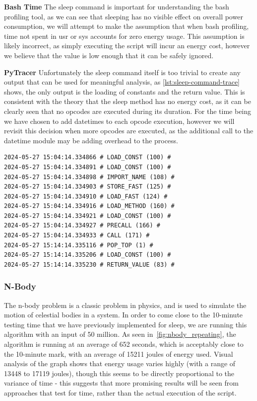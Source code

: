 \textbf{Bash Time}
The sleep command is important for understanding the bash profiling tool, as we can see that sleeping has no visible
effect on overall power consumption, we will attempt to make the assumption that when bash profiling, time not spent in
usr or sys accounts for zero energy usage.
This assumption is likely incorrect, as simply executing the script will incur an energy cost, however we believe that
the value is low enough that it can be safely ignored.

\textbf{PyTracer}
Unfortunately the sleep command itself is too trivial to create any output that can be used for meaningful analysis, as
\ref{lst:sleep-command-trace} shows, the only output is the loading of constants and the return value.
This is consistent with the theory that the sleep method has no energy cost, as it can be clearly seen that no opcodes
are executed during its duration.
For the time being we have chosen to add datetimes to each opcode execution, however we will revisit this decision when
more opcodes are executed, as the additional call to the datetime module may be adding overhead to the process.

\begin{lstlisting}[caption={systemd timer},captionpos=b,label={lst:sleep-command-trace}]
2024-05-27 15:04:14.334866 # LOAD_CONST (100) #
2024-05-27 15:04:14.334891 # LOAD_CONST (100) #
2024-05-27 15:04:14.334898 # IMPORT_NAME (108) #
2024-05-27 15:04:14.334903 # STORE_FAST (125) #
2024-05-27 15:04:14.334910 # LOAD_FAST (124) #
2024-05-27 15:04:14.334916 # LOAD_METHOD (160) #
2024-05-27 15:04:14.334921 # LOAD_CONST (100) #
2024-05-27 15:04:14.334927 # PRECALL (166) #
2024-05-27 15:04:14.334933 # CALL (171) #
2024-05-27 15:14:14.335116 # POP_TOP (1) #
2024-05-27 15:14:14.335206 # LOAD_CONST (100) #
2024-05-27 15:14:14.335230 # RETURN_VALUE (83) #
\end{lstlisting}

\subsubsection{N-Body}
The n-body problem is a classic problem in physics, and is used to simulate the motion of celestial bodies in a system.
In order to come close to the 10-minute testing time that we have previously implemented for sleep, we are running this
algorithm with an input of 50 million.
As seen in~\ref{fig:nbody_repeating}, the algorithm is running at an average of 652 seconds, which is acceptably close
to the 10-minute mark, with an average of 15211 joules of energy used.
Visual analysis of the graph shows that energy usage varies highly (with a range of 13448 to 17119 joules), though this
seems to be directly proportional to the variance of time - this suggests that more promising results will be seen from
approaches that test for time, rather than the actual execution of the script.

